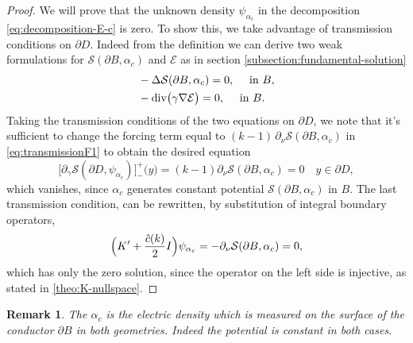 \documentclass[10pt, a4paper, twoside, openright]{book}
\theoremstyle{definition}
\theoremstyle{plain}
\theoremstyle{plain}
\theoremstyle{plain}
\theoremstyle{plain}
\newtheorem{remark}[subsection]{Remark}
\theoremstyle{plain}
\theoremstyle{plain}
\theoremstyle{plain}
\theoremstyle{plain}
\DeclareMathOperator{\divergence}{div}
\begin{document}
\begin{proof}
We will prove that the unknown density $\psi_{\alpha_c}$ in the decomposition \eqref{eq:decomposition-E-c} is zero. 
To show this, we take advantage of transmission conditions on $\partial D$. 
Indeed from the definition we can derive two weak formulations for $\mathcal{S}(\partial B, \alpha_c)$ and $\mathcal{E}$ as in section \ref{subsection:fundamental-solution}
\begin{align}
 &-\Delta\mathcal{S}(\partial B,\alpha_c) = 0,\quad\textup{ in }B,\\
 &-\divergence\bigl(\gamma\nabla\mathcal{E}\bigr) = 0,\quad\textup{ in }B.
\end{align}
Taking the transmission conditions of the two equations on $\partial D$, we note that it's sufficient to change the forcing term equal to $(k-1)\,\partial_\nu\mathcal{S}(\partial B, \alpha_{c})$ in \eqref{eq:transmissionF1} to obtain the desired equation
\begin{equation}
 \bigl[\partial_\gamma \mathcal{S}(\partial D,\psi_{\alpha_{c}})\bigr]^+_-\bigl(y\bigr) = (k - 1)\partial_\nu \mathcal{S}(\partial B,\alpha_{c})=0 \quad y \in\partial D,
\end{equation}
which vanishes, since $\alpha_{c}$ generates constant potential $\mathcal{S}(\partial B,\alpha_{c})$ in $B$. The last transmission condition, can be rewritten, by substitution of integral boundary operators,
\begin{equation}
 \Bigl(K' + \frac{\hat{c}(k)}{2} I\Bigr)\psi_{\alpha_c} = -\partial_\nu \mathcal{S}(\partial B, \alpha_c) = 0,
\end{equation}
which has only the zero solution, since the operator on the left side is injective, as stated in \ref{theo:K-nullspace}.
\end{proof}
\begin{remark}
 The $\alpha_c$ is the electric density which is measured on the surface of the conductor $\partial B$ in both geometries. Indeed the potential is constant in both cases.
\end{remark}
\end{document}
